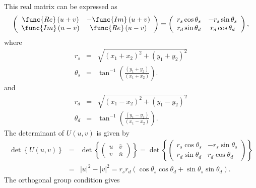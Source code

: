 \documentclass[aps,preprint]{revtex4}
\begin{document}
This real matrix can be expressed as 
\begin{equation}
\left( 
\begin{array}{cc}
\func{Re}\left( u+v\right) & -\func{Im}\left( u+v\right) \\ 
\func{Im}\left( u-v\right) & \func{Re}\left( u-v\right)%
\end{array}%
\right) =\left( 
\begin{array}{cc}
r_{s}\cos \theta _{s} & -r_{s}\sin \theta _{s} \\ 
r_{d}\sin \theta _{d} & r_{d}\cos \theta _{d}%
\end{array}%
\right) ,
\end{equation}%
where 
\begin{eqnarray}
r_{s} &=&\sqrt{\left( x_{1}+x_{2}\right) ^{2}+\left( y_{1}+y_{2}\right) ^{2}}
\\
\theta _{s} &=&\tan ^{-1}\left( \frac{\left( y_{1}+y_{2}\right) }{\left(
x_{1}+x_{2}\right) }\right) .
\end{eqnarray}%
and 
\begin{eqnarray}
r_{d} &=&\sqrt{\left( x_{1}-x_{2}\right) ^{2}+\left( y_{1}-y_{2}\right) ^{2}}
\\
\theta _{d} &=&\tan ^{-1}\left( \frac{\left( y_{1}-y_{2}\right) }{\left(
x_{1}-x_{2}\right) }\right) .
\end{eqnarray}%
The determinant of $U\left( u,v\right) $ is given by 
\begin{eqnarray}
\det \left\{ U\left( u,v\right) \right\} &=&\det \left\{ \left( 
\begin{array}{cc}
u & \overline{v} \\ 
v & \overline{u}%
\end{array}%
\right) \right\} =\det \left\{ \left( 
\begin{array}{cc}
r_{s}\cos \theta _{s} & -r_{s}\sin \theta _{s} \\ 
r_{d}\sin \theta _{d} & r_{d}\cos \theta _{d}%
\end{array}%
\right) \right\} \\
&=&\left\vert u\right\vert ^{2}-\left\vert v\right\vert
^{2}=r_{s}r_{d}\left( \cos \theta _{s}\cos \theta _{d}+\sin \theta _{s}\sin
\theta _{d}\right) .
\end{eqnarray}%
The orthogonal group condition gives%
\end{document}
